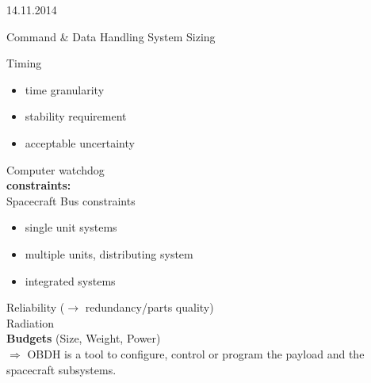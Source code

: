 \begin{chapter}{14.11.2014}
\begin{section}{Command \& Data Handling System Sizing}
\begin{itemize}
  \end{itemize}
  Timing
  \begin{itemize}
   \item time granularity
   \item stability requirement
   \item acceptable uncertainty
  \end{itemize}
  Computer watchdog\\
  \textbf{constraints:}\\
  Spacecraft Bus constraints
  \begin{itemize}
   \item single unit systems
   \item multiple units, distributing system
   \item integrated systems
  \end{itemize}
  Reliability ($\rightarrow$ redundancy/parts quality)\\
  Radiation\\
  \textbf{Budgets} (Size, Weight, Power)\\
  $\Rightarrow$ OBDH is a tool to configure, control or program the payload and the spacecraft subsystems.

 \end{section}

\end{chapter}
